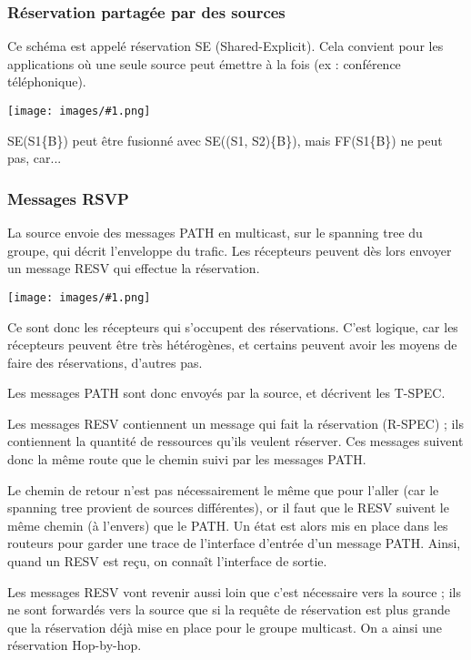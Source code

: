 \documentclass[10pt,a4paper]{report}
\newcommand{\dessin}[1]{\begin{center}\texttt{[image: images/\#1.png]}\end{center}}
\begin{document}
			\subsubsection{Réservation partagée par des sources}
			
			Ce schéma est appelé réservation SE (Shared-Explicit). Cela convient pour les applications où une seule source peut émettre à la fois (ex : conférence téléphonique).
			
			\dessin{123}
			
		
			SE(S1\{B\}) peut être fusionné avec SE((S1, S2)\{B\}), mais FF(S1\{B\}) ne peut pas, car...
		
		
			\subsubsection{Messages RSVP}
			
			La source envoie des messages PATH en multicast, sur le spanning tree du groupe, qui décrit l'enveloppe du trafic. Les récepteurs peuvent dès lors envoyer un message RESV qui effectue la réservation.
			
			\dessin{125}
			
			Ce sont donc les récepteurs qui s'occupent des réservations. C'est logique, car les récepteurs peuvent être très hétérogènes, et certains peuvent avoir les moyens de faire des réservations, d'autres pas.
			
			Les messages PATH sont donc envoyés par la source, et décrivent les T-SPEC.
			
			Les messages RESV contiennent un message qui fait la réservation (R-SPEC) ; ils contiennent la quantité de ressources qu'ils veulent réserver. Ces messages suivent donc la même route que le chemin suivi par les messages PATH.
		
			
			Le chemin de retour n'est pas nécessairement le même que pour l'aller (car le spanning tree provient de sources différentes), or il faut que le RESV suivent le même chemin (à l'envers) que le PATH. Un état est alors mis en place dans les routeurs pour garder une trace de l'interface d'entrée d'un message PATH. Ainsi, quand un RESV est reçu, on connaît l'interface de sortie. 
		
			Les messages RESV vont revenir aussi loin que c'est nécessaire vers la source ; ils ne sont forwardés vers la source que si la requête de réservation est plus grande que la réservation déjà mise en place pour le groupe multicast. On a ainsi une réservation Hop-by-hop.
		
\end{document}
